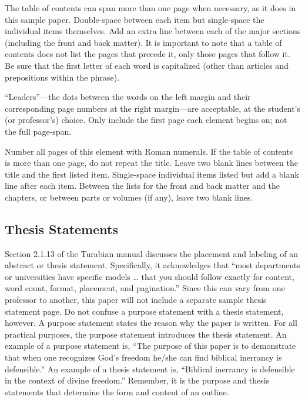 \documentclass[raggedright]{turabian-researchpaper}
\begin{document}
The table of contents can span more than one page when necessary, as it does in
this sample paper. Double-space between each item but single-space the
individual items themselves. Add an extra line between each of the major
sections (including the front and back matter). It is important to note that a
table of contents does not list the pages that precede it, only those pages that
follow it. Be sure that the first letter of each word is capitalized (other than
articles and prepositions within the phrase).

``Leaders''---the dots between the words on the left margin and their
corresponding page numbers at the right margin---are acceptable, at the
student's (or professor's) choice. Only include the first page each element
begins on; not the full page-span.

Number all pages of this element with Roman numerals. If the table of contents
is more than one page, do not repeat the title. Leave two blank lines between
the title and the first listed item. Single-space individual items listed but
add a blank line after each item. Between the lists for the front and back
matter and the chapters, or between parts or volumes (if any), leave two blank
lines.

\subsection{Thesis Statements}

Section 2.1.13 of the Turabian manual discusses the placement and labeling of an
abstract or thesis statement. Specifically, it acknowledges that ``most
departments or universities have specific models \dots{} that you should follow
exactly for content, word count, format, placement, and
pagination.''\autocite[389]{Turabian} Since this can vary from one professor to
another, this paper will not include a separate sample thesis statement page. Do
not confuse a purpose statement with a thesis statement, however. A purpose
statement states the reason why the paper is written. For all practical
purposes, the purpose statement introduces the thesis statement. An example of a
purpose statement is, ``The purpose of this paper is to demonstrate that when
one recognizes God's freedom he/she can find biblical inerrancy is defensible.''
An example of a thesis statement is, ``Biblical inerrancy is defensible in the
context of divine freedom.'' Remember, it is the purpose and thesis statements
that determine the form and content of an outline.
\end{document}
